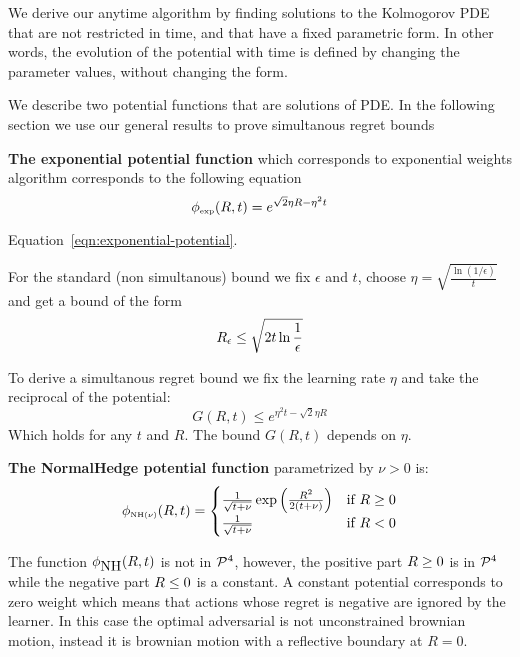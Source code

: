 \documentclass{article}[12pt]
\begin{document}
We derive our anytime algorithm by finding solutions to the Kolmogorov
PDE that are not restricted in time, and that have a fixed parametric
form.  In other words, the evolution of the potential with time is
defined by changing the parameter values, without changing the form.

We describe two potential functions that are solutions of PDE. In the following section we use our general results to prove simultanous regret bounds

{\bf The exponential potential function} which corresponds to exponential
  weights algorithm corresponds to the following equation
\begin{equation} \label{eqn:exponential-potential}
    \phi_{\mbox{\tiny exp}}(R,t) = e^{\sqrt{2} \eta R - \eta^2 t}
\end{equation}

Equation~\ref{eqn:exponential-potential}.

For the standard (non simultanous) bound we fix $\epsilon$ and $t$,
choose $\eta = \sqrt{\frac{\ln (1/\epsilon)}{t}}$
and get a bound of the form 
  \begin{equation}
    R_\epsilon \leq \sqrt{2 t \ln \frac{1}{\epsilon}}
  \end{equation}

  To derive a simultanous regret bound we fix the learning rate $\eta$ and take the reciprocal of the potential:
 \[
    G(R,t) \leq e^{\eta^2 t - \sqrt{2}\eta R}
 \]
Which holds for any $t$ and $R$. The bound $G(R,t)$ depends on $\eta$.

  
{\bf The NormalHedge potential function} parametrized by $\nu>0$ is:
\begin{equation} \label{eqn:NormalHedge}
  \phi_{\mbox{\tiny NH$(\nu)$}}(R,t) = \begin{cases}
    \frac{1}{\sqrt{t+\nu}}\exp\left(\frac{R^2}{2(t+\nu)}\right)
    & \mbox{if } R \geq 0  \\
  \frac{1}{\sqrt{t+\nu}} & \mbox{if } R <0
  \end{cases}
\end{equation}

The function $\phi_{\mbox{NH}}(R,t)$ is not in ${\cal P}^{4}$, however, the
positive part $R\geq 0$ is in ${\cal P}^{4}$ while the negative part
$R \leq 0$ is a constant. A constant potential corresponds to zero weight which means that actions whose regret is negative are ignored by the learner. In this case the optimal adversarial is not unconstrained brownian motion, instead it is brownian motion with a reflective boundary at $R=0$.
\end{document}

